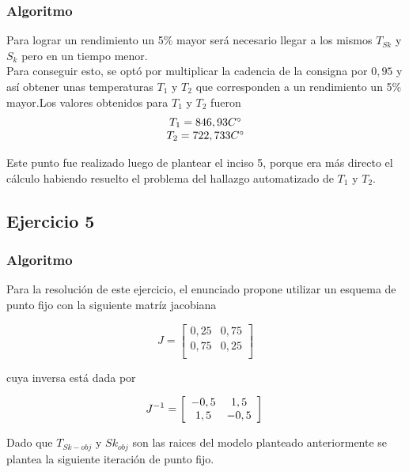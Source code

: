 \documentclass[10pt,a4paper]{article}
\begin{document}
\subsubsection{Algoritmo}

Para lograr un rendimiento un 5\% mayor será necesario llegar a los mismos $T_{Sk}$ y $S_{k}$ pero en un tiempo menor.\\

Para conseguir esto, se optó por multiplicar la cadencia de la consigna por $0,95$ y así obtener unas temperaturas $T_{1}$ y $T_{2}$ que corresponden a un rendimiento un 5\% mayor.Los valores obtenidos para $T_{1}$ y $T_{2}$ fueron\\

\[
\begin{array}{cc}
      T_{1}=846,93 C\degree \\
      T_{2}=722,733 C\degree\\
\end{array}
\]

Este punto fue realizado luego de plantear el inciso 5, porque era más directo el cálculo habiendo resuelto el problema del hallazgo automatizado de $T_{1}$ y $T_{2}$.


\subsection{Ejercicio 5}

\subsubsection{Algoritmo}

Para la resolución de este ejercicio, el enunciado propone utilizar un esquema de punto fijo con la siguiente matríz jacobiana

\[
   J=
  \left[ {\begin{array}{cc}
   0,25 & 0,75 \\
   0,75 & 0,25 \\
  \end{array} } \right]
\]

cuya inversa está dada por

\[
   J^{-1}=
  \left[ {\begin{array}{cc}
   -0,5 & 1,5 \\
    1,5 & -0,5 \\
  \end{array} } \right]\\
\]

Dado que $T_{Sk-obj}$ y $Sk_{obj}$ son las raices del modelo planteado anteriormente se plantea la siguiente iteración de punto fijo.\\
\end{document}
